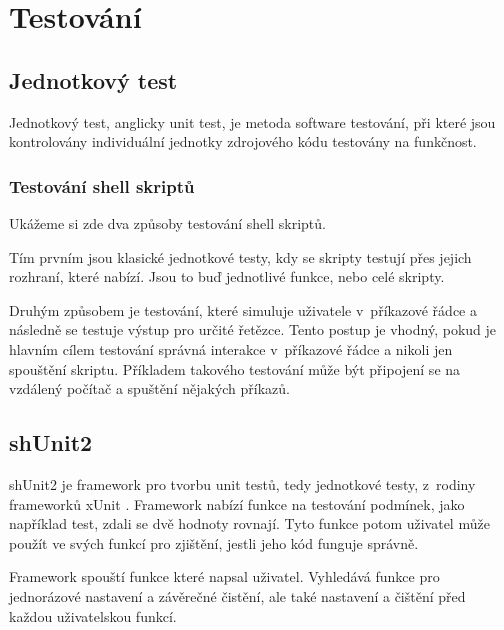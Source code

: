 \documentclass[thesis=M,czech]{FITthesis}[2012/06/26]
\begin{document}
%
%
\chapter{Testování}

%
\section{Jednotkový test}

Jednotkový test, anglicky unit test, je metoda software testování, při které jsou kontrolovány individuální jednotky zdrojového kódu testovány na funkčnost.

%
\subsection{Testování shell skriptů}

Ukážeme si zde dva způsoby testování shell skriptů.

Tím prvním jsou klasické jednotkové testy, kdy se skripty testují přes jejich rozhraní, které nabízí. Jsou to buď jednotlivé funkce, nebo celé skripty.

Druhým způsobem je testování, které simuluje uživatele v~příkazové řádce a následně se testuje výstup pro určité řetězce. Tento postup je vhodný, pokud je hlavním cílem testování správná interakce v~příkazové řádce a nikoli jen spouštění skriptu. Příkladem takového testování může být připojení se na vzdálený počítač a spuštění nějakých příkazů.



\section{shUnit2}

shUnit2 \cite{shunit2} je framework pro tvorbu unit testů, tedy jednotkové testy, z~rodiny frameworků xUnit \cite{xunit}. Framework nabízí funkce na testování podmínek, jako například test, zdali se dvě hodnoty rovnají. Tyto funkce potom uživatel může použít ve svých funkcí pro zjištění, jestli jeho kód funguje správně.

Framework spouští funkce které napsal uživatel. Vyhledává funkce pro jednorázové nastavení a závěrečné čistění, ale také nastavení a čištění před každou uživatelskou funkcí.
\end{document}
